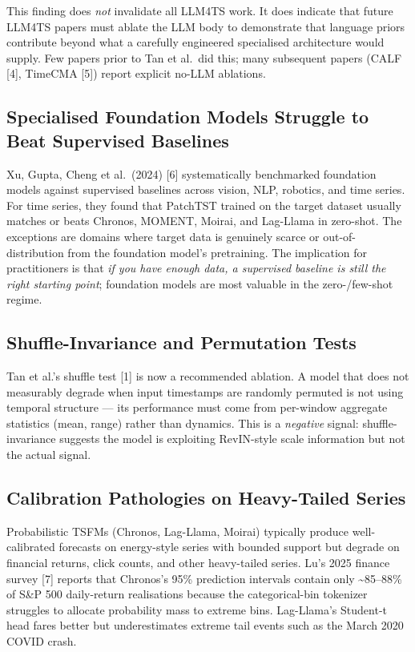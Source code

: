 \documentclass{article}
\begin{document}
This finding does \emph{not} invalidate all LLM4TS work. It does indicate that future LLM4TS papers must ablate the LLM body to demonstrate that language priors contribute beyond what a carefully engineered specialised architecture would supply. Few papers prior to Tan et al.~did this; many subsequent papers (CALF {[}4{]}, TimeCMA {[}5{]}) report explicit no-LLM ablations.

\subsection{Specialised Foundation Models Struggle to Beat Supervised Baselines}\label{specialised-foundation-models-struggle-to-beat-supervised-baselines}

Xu, Gupta, Cheng et al.~(2024) {[}6{]} systematically benchmarked foundation models against supervised baselines across vision, NLP, robotics, and time series. For time series, they found that PatchTST trained on the target dataset usually matches or beats Chronos, MOMENT, Moirai, and Lag-Llama in zero-shot. The exceptions are domains where target data is genuinely scarce or out-of-distribution from the foundation model's pretraining. The implication for practitioners is that \emph{if you have enough data, a supervised baseline is still the right starting point}; foundation models are most valuable in the zero-/few-shot regime.

\subsection{Shuffle-Invariance and Permutation Tests}\label{shuffle-invariance-and-permutation-tests}

Tan et al.'s shuffle test {[}1{]} is now a recommended ablation. A model that does not measurably degrade when input timestamps are randomly permuted is not using temporal structure --- its performance must come from per-window aggregate statistics (mean, range) rather than dynamics. This is a \emph{negative} signal: shuffle-invariance suggests the model is exploiting RevIN-style scale information but not the actual signal.

\subsection{Calibration Pathologies on Heavy-Tailed Series}\label{calibration-pathologies-on-heavy-tailed-series}

Probabilistic TSFMs (Chronos, Lag-Llama, Moirai) typically produce well-calibrated forecasts on energy-style series with bounded support but degrade on financial returns, click counts, and other heavy-tailed series. Lu's 2025 finance survey {[}7{]} reports that Chronos's 95\% prediction intervals contain only \textasciitilde85--88\% of S\&P 500 daily-return realisations because the categorical-bin tokenizer struggles to allocate probability mass to extreme bins. Lag-Llama's Student-t head fares better but underestimates extreme tail events such as the March 2020 COVID crash.
\end{document}

